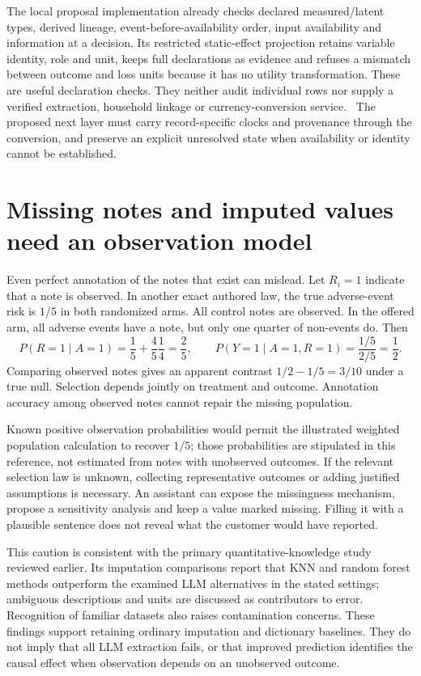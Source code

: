 The local proposal implementation already checks declared measured/latent
types, derived lineage, event-before-availability order, input availability
and information at a decision. Its restricted static-effect projection
retains variable identity, role and unit, keeps full declarations as evidence
and refuses a mismatch between outcome and loss units because it has no
utility transformation. These are useful declaration checks. They neither
audit individual rows nor supply a verified extraction, household linkage or
currency-conversion service.~\citep{exec17_ontology_sources}
The proposed next layer must carry record-specific clocks and provenance
through the conversion, and preserve an explicit unresolved state when
availability or identity cannot be established.

\section{Missing notes and imputed values need an observation model}

Even perfect annotation of the notes that exist can mislead. Let
\(R_i=1\) indicate that a note is observed. In another exact authored law, the
true adverse-event risk is \(1/5\) in both randomized arms. All control notes
are observed. In the offered arm, all adverse events have a note, but only
one quarter of non-events do. Then
\[
 P(R=1\mid A=1)=\frac15+\frac45\frac14=\frac25,
 \qquad
 P(Y=1\mid A=1,R=1)=\frac{1/5}{2/5}=\frac12.
\]
Comparing observed notes gives an apparent contrast \(1/2-1/5=3/10\)
under a true null. Selection depends jointly on treatment and outcome.
Annotation accuracy among observed notes cannot repair the missing
population.~\citep{exec17_ontology_oracle}

Known positive observation probabilities would permit the illustrated
weighted population calculation to recover \(1/5\); those probabilities are
stipulated in this reference, not estimated from notes with unobserved
outcomes. If the relevant selection law is unknown, collecting representative
outcomes or adding justified assumptions is necessary. An assistant can expose
the missingness mechanism, propose a sensitivity analysis and keep a value
marked missing. Filling it with a plausible sentence does not reveal what
the customer would have reported.

This caution is consistent with the primary quantitative-knowledge study
reviewed earlier. Its imputation comparisons report that KNN and random
forest methods outperform the examined LLM alternatives in the stated
settings; ambiguous descriptions and units are discussed as contributors to
error. Recognition of familiar datasets also raises contamination concerns.
\citep{v12_la_2402_07770} These findings support retaining ordinary imputation
and dictionary baselines. They do not imply that all LLM extraction fails,
or that improved prediction identifies the causal effect when observation
depends on an unobserved outcome.

